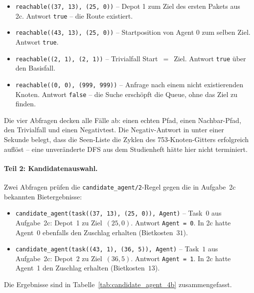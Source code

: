 \begin{itemize}
    \item \texttt{reachable((37, 13), (25, 0))} -- Depot 1 zum Ziel des ersten Pakets aus 2c. Antwort \texttt{true} -- die Route existiert.
    \item \texttt{reachable((43, 13), (25, 0))} -- Startposition von Agent 0 zum selben Ziel. Antwort \texttt{true}.
    \item \texttt{reachable((2, 1), (2, 1))} -- Trivialfall Start~$=$~Ziel. Antwort \texttt{true} über den Basisfall.
    \item \texttt{reachable((0, 0), (999, 999))} -- Anfrage nach einem nicht existierenden Knoten. Antwort \texttt{false} -- die Suche erschöpft die Queue, ohne das Ziel zu finden.
\end{itemize}

Die vier Abfragen decken alle Fälle ab: einen echten Pfad, einen Nachbar-Pfad, den Trivialfall und einen Negativtest. Die Negativ-Antwort in unter einer Sekunde belegt, dass die Seen-Liste die Zyklen des 753-Knoten-Gitters erfolgreich auflöst -- eine unveränderte DFS aus dem Studienheft hätte hier nicht terminiert.

\paragraph{Teil 2: Kandidatenauswahl.}
Zwei Abfragen prüfen die \texttt{candidate\_agent/2}-Regel gegen die in Aufgabe~2c bekannten Bietergebnisse:



\begin{itemize}
    \item \texttt{candidate\_agent(task((37, 13), (25, 0)), Agent)} -- Task~$0$ aus Aufgabe~2c: Depot~1 zu Ziel~$(25,0)$. Antwort \texttt{Agent = 0}. In 2c hatte Agent~0 ebenfalls den Zuschlag erhalten (Bietkosten~$31$).
    \item \texttt{candidate\_agent(task((43, 1), (36, 5)), Agent)} -- Task~$1$ aus Aufgabe~2c: Depot~$2$ zu Ziel~$(36,5)$. Antwort \texttt{Agent = 1}. In 2c hatte Agent~1 den Zuschlag erhalten (Bietkosten~$13$).
\end{itemize}

Die Ergebnisse sind in Tabelle~\ref{tab:candidate_agent_4b} zusammengefasst.

